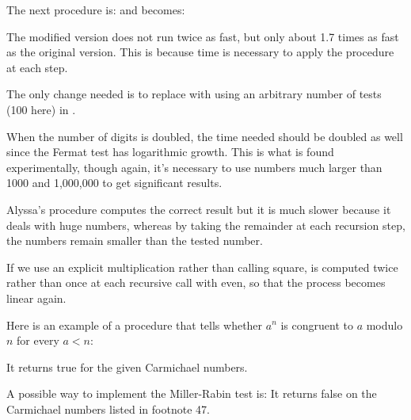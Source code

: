 \begin{exe}[1.23]
    The next procedure is:
    and  becomes:

    The modified version does not run twice as fast, but only about 1.7 times 
    as fast as the original version. This is because time is necessary to 
    apply the  procedure at each step.
\end{exe}

\begin{exe}[1.24]
    The only change needed is to replace  with  
    using an arbitrary number of tests (100 here) in .

    When the number of digits is doubled, the time needed should be doubled as 
    well since the Fermat test has logarithmic growth. This is what is found 
    experimentally, though again, it’s necessary to use numbers much larger 
    than 1000 and 1,000,000 to get significant results.
\end{exe}

\begin{exe}[1.25]
    Alyssa’s procedure computes the correct result but it is much slower 
    because it deals with huge numbers, whereas by taking the remainder at 
    each recursion step, the numbers remain smaller than the tested number.
\end{exe}

\begin{exe}[1.26]
    If we use an explicit multiplication rather than calling square, 
     is computed twice rather than once at 
    each recursive call with  even, so that the process becomes 
    linear again.
\end{exe}

\begin{exe}[1.27]
    Here is an example of a procedure that tells whether $a^n$ is congruent to 
    $a$ modulo $n$ for every $a < n$:

    It returns true for the given Carmichael numbers.
\end{exe}

\begin{exe}[1.28]
    A possible way to implement the Miller-Rabin test is:
    It returns false on the Carmichael numbers listed in footnote 47.
\end{exe}

